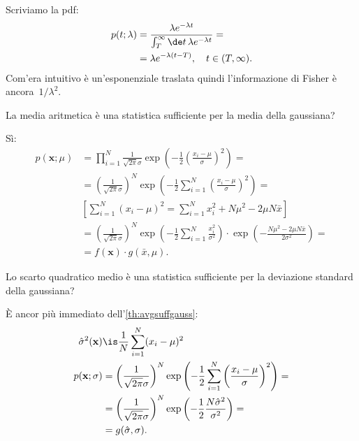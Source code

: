 \begin{solution}
	Scriviamo la pdf:
	\begin{align*}
		p(t;\lambda)
		&= \frac {\lambda e^{-\lambda t}} {\int_T^\infty \de t\, \lambda e^{-\lambda t}} = \\
		&= \lambda e^{-\lambda (t-T)}, \quad t\in(T,\infty).
	\end{align*}
	Com'era intuitivo è un'esponenziale traslata quindi l'informazione di Fisher è ancora~$1/\lambda^2$.
\end{solution}

\begin{exercise}
	\label{th:avgsuffgauss}
	La media aritmetica è una statistica sufficiente per la media della gaussiana?
\end{exercise}

\begin{solution*}
	Sì:
	\begin{align*}
		p(\mathbf x;\mu)
		&= \prod_{i=1}^N \frac1{\sqrt{2\pi}\sigma} 
		\exp \left( -\frac12 \left( \frac{x_i-\mu}\sigma \right)^2 \right) = \\
		&= \left( \frac1{\sqrt{2\pi}\sigma} \right)^N
		\exp \left( -\frac12 \sum_{i=1}^N \left( \frac{x_i-\mu}\sigma \right)^2 \right) = \\
		&\left[ \sum_{i=1}^N (x_i-\mu)^2
		= \sum_{i=1}^N x_i^2 + N\mu^2 - 2\mu N\bar x \right] \\
		&= \left( \frac1{\sqrt{2\pi}\sigma} \right)^N
		\exp \left( -\frac12 \sum_{i=1}^N \frac{x_i^2}{\sigma^2} \right)
		\cdot \exp \left( -\frac{N\mu^2-2\mu N\bar x}{2\sigma^2} \right) = \\
		&= f(\mathbf x) \cdot g(\bar x,\mu).
	\end{align*}
\end{solution*}

\begin{exercise}
	Lo scarto quadratico medio è una statistica sufficiente per la deviazione standard della gaussiana?
\end{exercise}

\begin{solution*}
	È ancor più immediato dell'\autoref{th:avgsuffgauss}:
	\begin{align*}
		\hat\sigma^2(\mathbf x)
		&\is \frac1N \sum_{i=1}^N (x_i-\mu)^2 \\
		p(\mathbf x;\sigma)
		&= \left( \frac1{\sqrt{2\pi}\sigma} \right)^N
		\exp \left( -\frac12 \sum_{i=1}^N \left( \frac{x_i-\mu}\sigma \right)^2 \right) = \\
		&= \left( \frac1{\sqrt{2\pi}\sigma} \right)^N
		\exp \left( -\frac12 \frac{N\hat\sigma^2}{\sigma^2} \right) = \\
		&= g(\hat\sigma,\sigma).
	\end{align*}
\end{solution*}

